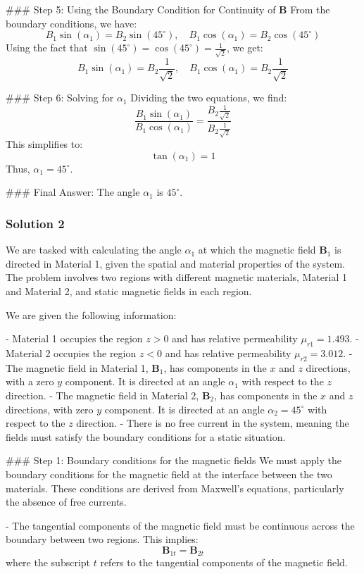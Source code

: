 \documentclass{article}
\begin{document}
### Step 5: Using the Boundary Condition for Continuity of $\mathbf{B}$
From the boundary conditions, we have:
\[
B_1 \sin(\alpha_1) = B_2 \sin(45^\circ), \quad B_1 \cos(\alpha_1) = B_2 \cos(45^\circ)
\]
Using the fact that $\sin(45^\circ) = \cos(45^\circ) = \frac{1}{\sqrt{2}}$, we get:
\[
B_1 \sin(\alpha_1) = B_2 \frac{1}{\sqrt{2}}, \quad B_1 \cos(\alpha_1) = B_2 \frac{1}{\sqrt{2}}
\]

### Step 6: Solving for $\alpha_1$
Dividing the two equations, we find:
\[
\frac{B_1 \sin(\alpha_1)}{B_1 \cos(\alpha_1)} = \frac{B_2 \frac{1}{\sqrt{2}}}{B_2 \frac{1}{\sqrt{2}}}
\]
This simplifies to:
\[
\tan(\alpha_1) = 1
\]
Thus, $\alpha_1 = 45^\circ$.

### Final Answer:
The angle $\alpha_1$ is $45^\circ$.


\subsubsection{Solution 2}
We are tasked with calculating the angle $\alpha_1$ at which the magnetic field $\mathbf{B}_1$ is directed in Material 1, given the spatial and material properties of the system. The problem involves two regions with different magnetic materials, Material 1 and Material 2, and static magnetic fields in each region.

We are given the following information:

- Material 1 occupies the region $z > 0$ and has relative permeability $\mu_{r1} = 1.493$. 
- Material 2 occupies the region $z < 0$ and has relative permeability $\mu_{r2} = 3.012$.
- The magnetic field in Material 1, $\mathbf{B}_1$, has components in the $x$ and $z$ directions, with a zero $y$ component. It is directed at an angle $\alpha_1$ with respect to the $z$ direction.
- The magnetic field in Material 2, $\mathbf{B}_2$, has components in the $x$ and $z$ directions, with zero $y$ component. It is directed at an angle $\alpha_2 = 45^\circ$ with respect to the $z$ direction.
- There is no free current in the system, meaning the fields must satisfy the boundary conditions for a static situation.

### Step 1: Boundary conditions for the magnetic fields
We must apply the boundary conditions for the magnetic field at the interface between the two materials. These conditions are derived from Maxwell’s equations, particularly the absence of free currents.

- The tangential components of the magnetic field must be continuous across the boundary between two regions. This implies:
  \[
  \mathbf{B}_{1t} = \mathbf{B}_{2t}
  \]
  where the subscript $t$ refers to the tangential components of the magnetic field.
\end{document}
